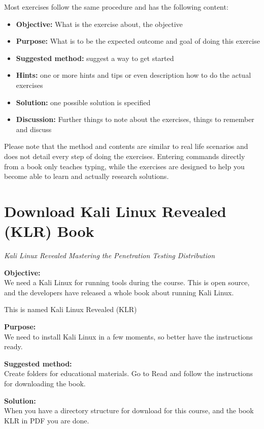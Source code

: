 \documentclass[a4paper,11pt,notitlepage]{report}
\begin{document}
Most exercises follow the same procedure and has the following content:
\begin{itemize}
\item {\bf Objective:} What is the exercise about, the objective
\item {\bf Purpose:} What is to be the expected outcome and goal of doing this exercise
\item {\bf Suggested method:} suggest a way to get started
\item {\bf Hints:} one or more hints and tips or even description how to
do the actual exercises
\item {\bf Solution:} one possible solution is specified
\item {\bf Discussion:} Further things to note about the exercises, things to remember and discuss
\end{itemize}

Please note that the method and contents are similar to real life scenarios and does not detail every step of doing the exercises. Entering commands directly from a book only teaches typing, while the exercises are designed to help you become able to learn and actually research solutions.


\chapter{Download Kali Linux Revealed (KLR) Book }
\label{ex:downloadKLR}



\emph{Kali Linux Revealed  Mastering the Penetration Testing Distribution}


{\bf Objective:}\\
We need a Kali Linux for running tools during the course. This is open source, and the developers have released a whole book about running Kali Linux.

This is named Kali Linux Revealed (KLR)

{\bf Purpose:}\\
We need to install Kali Linux in a few moments, so better have the instructions ready.

{\bf Suggested method:}\\
Create folders for educational materials. Go to 
Read and follow the instructions for downloading the book.

{\bf Solution:}\\
When you have a directory structure for download for this course, and the book KLR in PDF you are done.
\end{document}
